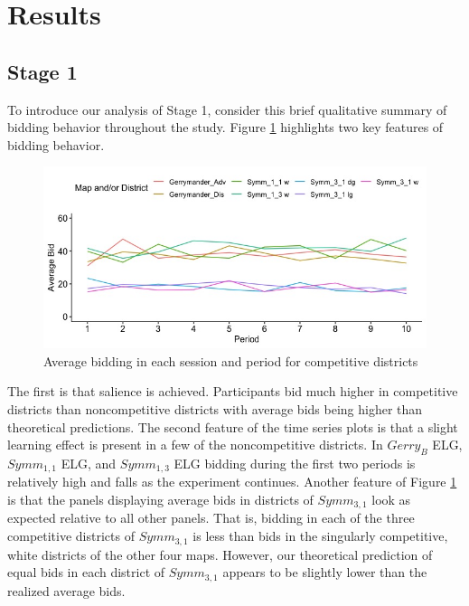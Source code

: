 \documentclass[AER]{AEA}
\begin{document}

\section{Results}
\label{section:results}

\subsection{Stage 1}
\label{subsection:Stage_1}

To introduce our analysis of Stage 1, consider this brief qualitative summary of bidding behavior throughout the study. Figure \ref{fig:full_bidding_time_series} highlights two key features of bidding behavior. 
\begin{figure}[h]
\centering
\includegraphics[scale=0.5]{full_bidding_ts_one_to_ten}
\caption{Average bidding in each session and period for competitive districts}
\label{fig:full_bidding_time_series}
\end{figure}
The first is that salience is achieved. Participants bid much higher in competitive districts than noncompetitive districts with average bids being higher than theoretical predictions. The second feature of the time series plots is that a slight learning effect is present in a few of the noncompetitive districts. In $Gerry_B$ ELG, $Symm_{1,1}$ ELG, and $Symm_{1,3}$ ELG bidding during the first two periods is relatively high and falls as the experiment continues. Another feature of Figure \ref{fig:full_bidding_time_series} is that the panels displaying average bids in districts of $Symm_{3,1}$ look as expected relative to all other panels. That is, bidding in each of the three competitive districts of $Symm_{3,1}$ is less than bids in the singularly competitive, white districts of the other four maps. However, our theoretical prediction of equal bids in each district of $Symm_{3,1}$ appears to be slightly lower than the realized average bids.
\end{document}
